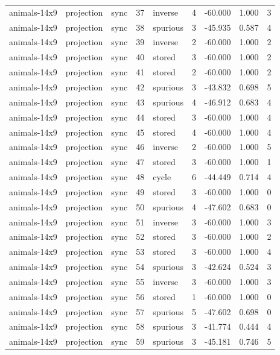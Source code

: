 \begin{tabular}{lllrlrrrr}
animals-14x9 & projection & sync & 37 & inverse & 4 & -60.000 & 1.000 & 3 \\
animals-14x9 & projection & sync & 38 & spurious & 3 & -45.935 & 0.587 & 4 \\
animals-14x9 & projection & sync & 39 & inverse & 2 & -60.000 & 1.000 & 2 \\
animals-14x9 & projection & sync & 40 & stored & 3 & -60.000 & 1.000 & 2 \\
animals-14x9 & projection & sync & 41 & stored & 2 & -60.000 & 1.000 & 2 \\
animals-14x9 & projection & sync & 42 & spurious & 3 & -43.832 & 0.698 & 5 \\
animals-14x9 & projection & sync & 43 & spurious & 4 & -46.912 & 0.683 & 4 \\
animals-14x9 & projection & sync & 44 & stored & 3 & -60.000 & 1.000 & 4 \\
animals-14x9 & projection & sync & 45 & stored & 4 & -60.000 & 1.000 & 4 \\
animals-14x9 & projection & sync & 46 & inverse & 2 & -60.000 & 1.000 & 5 \\
animals-14x9 & projection & sync & 47 & stored & 3 & -60.000 & 1.000 & 1 \\
animals-14x9 & projection & sync & 48 & cycle & 6 & -44.449 & 0.714 & 4 \\
animals-14x9 & projection & sync & 49 & stored & 3 & -60.000 & 1.000 & 0 \\
animals-14x9 & projection & sync & 50 & spurious & 4 & -47.602 & 0.683 & 0 \\
animals-14x9 & projection & sync & 51 & inverse & 3 & -60.000 & 1.000 & 3 \\
animals-14x9 & projection & sync & 52 & stored & 3 & -60.000 & 1.000 & 2 \\
animals-14x9 & projection & sync & 53 & stored & 3 & -60.000 & 1.000 & 4 \\
animals-14x9 & projection & sync & 54 & spurious & 3 & -42.624 & 0.524 & 3 \\
animals-14x9 & projection & sync & 55 & inverse & 3 & -60.000 & 1.000 & 3 \\
animals-14x9 & projection & sync & 56 & stored & 1 & -60.000 & 1.000 & 0 \\
animals-14x9 & projection & sync & 57 & spurious & 5 & -47.602 & 0.698 & 0 \\
animals-14x9 & projection & sync & 58 & spurious & 3 & -41.774 & 0.444 & 4 \\
animals-14x9 & projection & sync & 59 & spurious & 3 & -45.181 & 0.746 & 5 \\

\end{tabular}
